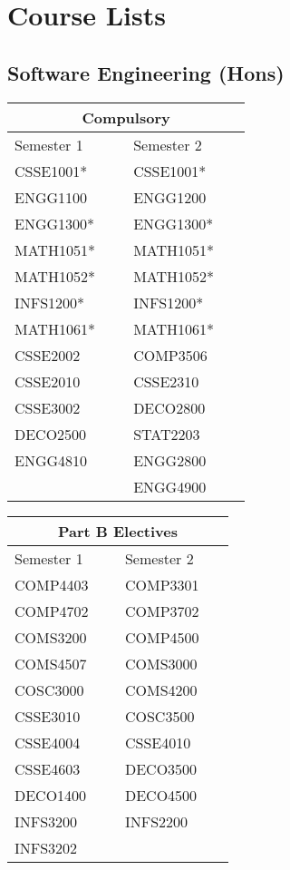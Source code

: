 \section{Course Lists}
\subsection{Software Engineering (Hons)}
\begin{center}
	\begin{tabular}{p{0.4\linewidth} | p{0.4\linewidth}}
		\multicolumn{2}{c}{\textbf{Compulsory}} \\ \midrule
		Semester 1 & Semester 2 \\ \midrule
		CSSE1001*	&	CSSE1001* \\
		ENGG1100	&	ENGG1200 \\
		ENGG1300*	&	ENGG1300* \\
		MATH1051*	&	MATH1051* \\
		MATH1052*	&	MATH1052* \\
		INFS1200*	&	INFS1200* \\
		MATH1061*	&	MATH1061* \\
		CSSE2002	&	COMP3506 \\
		CSSE2010	&	CSSE2310 \\
		CSSE3002	&	DECO2800 \\
		DECO2500	&	STAT2203 \\
		ENGG4810	&	ENGG2800 \\
			&	ENGG4900 \\
		\bottomrule
	\end{tabular}
\end{center}
\begin{center}
	\begin{tabular}{p{0.4\linewidth} | p{0.4\linewidth}}
		\multicolumn{2}{c}{\textbf{Part B Electives}} \\ \midrule
		Semester 1 & Semester 2 \\ \midrule
		COMP4403	&	COMP3301 \\
		COMP4702	&	COMP3702 \\
		COMS3200	&	COMP4500 \\
		COMS4507	&	COMS3000 \\
		COSC3000	&	COMS4200 \\
		CSSE3010	&	COSC3500 \\
		CSSE4004	&	CSSE4010 \\
		CSSE4603	&	DECO3500 \\
		DECO1400	&	DECO4500 \\
		INFS3200	&	INFS2200 \\
		INFS3202	&	 \\
		\bottomrule
	\end{tabular}
\end{center}
